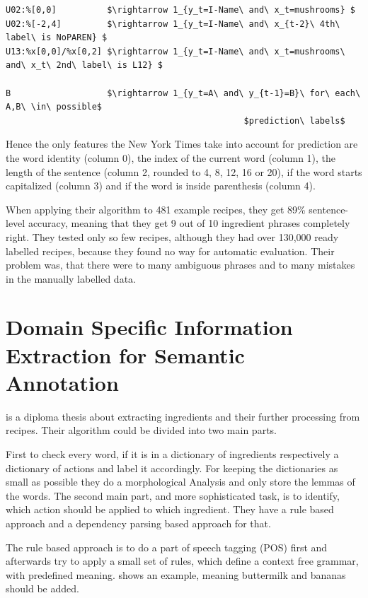 \documentclass[12pt, twoside]{report}
\begin{document}
\begin{lstlisting}[frame=single, caption={Extracting of feature functions from templates}, label=lst:featureFunctionExtraction, mathescape]
U02:%[0,0]          $\rightarrow 1_{y_t=I-Name\ and\ x_t=mushrooms} $
U02:%[-2,4]         $\rightarrow 1_{y_t=I-Name\ and\ x_{t-2}\ 4th\ label\ is NoPAREN} $
U13:%x[0,0]/%x[0,2] $\rightarrow 1_{y_t=I-Name\ and\ x_t=mushrooms\ and\ x_t\ 2nd\ label\ is L12} $

B                   $\rightarrow 1_{y_t=A\ and\ y_{t-1}=B}\ for\ each\ A,B\ \in\ possible$
                                               $prediction\ labels$
\end{lstlisting}

Hence the only features the New York Times take into account for prediction are the word identity (column 0), the index of the current word (column 1), the length of the sentence (column 2, rounded to 4, 8, 12, 16 or 20), if the word starts capitalized (column 3) and if the word is inside parenthesis (column 4).

When applying their algorithm to 481 example recipes, they get 89\% sentence-level accuracy, meaning that they get 9 out of 10 ingredient phrases completely right. They tested only so few recipes, although they had over 130,000 ready labelled recipes, because they found no way for automatic evaluation. Their problem was, that there were to many ambiguous phrases and to many mistakes in the manually labelled data.
 
 
\section{Domain Specific Information Extraction for Semantic Annotation}
\parencite{GrammaBased} is a diploma thesis about extracting ingredients and their further processing from recipes. Their algorithm could be divided into two main parts.

First to check every word, if it is in a dictionary of ingredients respectively a dictionary of actions and label it accordingly. For keeping the dictionaries as small as possible they do a morphological Analysis and only store the lemmas of the words. The second main part, and more sophisticated task, is to identify, which action should be applied to which ingredient. They have a rule based approach and a dependency parsing based approach for that.

The rule based approach is to do a part of speech tagging (POS) first and afterwards try to apply a small set of rules, which define a context free grammar, with predefined meaning.  shows an example, meaning buttermilk and bananas should be added.
\end{document}
